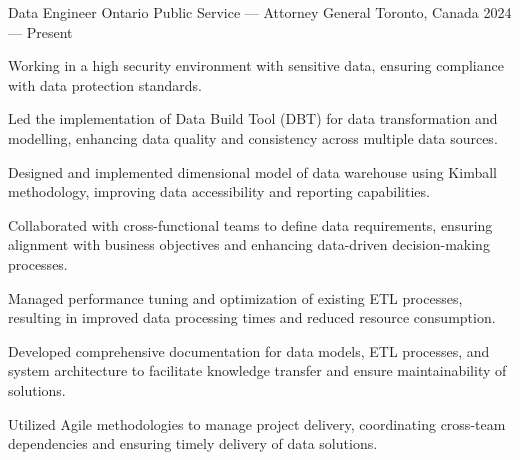 

\begin{cventries}


\cventry%
 {Data Engineer}
 {Ontario Public Service --- Attorney General}
 {Toronto, Canada}
 {2024 --- Present}
 {
  \begin{cvitems}
    \item Working in a high security environment with sensitive data, ensuring compliance with data protection standards.
    \item Led the implementation of Data Build Tool (DBT) for data transformation and modelling, enhancing data quality and consistency across multiple data sources.
    \item Designed and implemented dimensional model of data warehouse using Kimball methodology, improving data accessibility and reporting capabilities.
    \item Collaborated with cross-functional teams to define data requirements, ensuring alignment with business objectives and enhancing data-driven decision-making processes.
    \item Managed performance tuning and optimization of existing ETL processes, resulting in improved data processing times and reduced resource consumption.
    \item Developed comprehensive documentation for data models, ETL processes, and system architecture to facilitate knowledge transfer and ensure maintainability of solutions.
    \item Utilized Agile methodologies to manage project delivery, coordinating cross-team dependencies and ensuring timely delivery of data solutions.
  \end{cvitems}
 }


\end{cventries}
